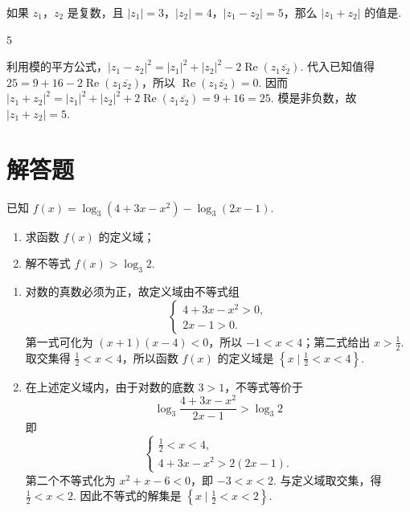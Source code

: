 \documentclass[UTF8,a4paper,oneside,11pt]{ctexbook}
\begin{document}
\begin{problem}
如果 \(z_1\)，\(z_2\) 是复数，且 \(\left| z_1 \right|=3\)，\(\left| z_2 \right|=4\)，\(\left| z_1-z_2 \right|=5\)，那么 \(\left| z_1+z_2 \right|\) 的值是\fillinblank{}.
\end{problem}

\begin{answer}
\(5\)
\end{answer}

\begin{solution}
利用模的平方公式，\(\left|z_1-z_2\right|^2=|z_1|^2+|z_2|^2-2\operatorname{Re}(z_1\overline{z_2})\). 代入已知值得 \(25=9+16-2\operatorname{Re}(z_1\overline{z_2})\)，所以 \(\operatorname{Re}(z_1\overline{z_2})=0\). 因而 \(\left|z_1+z_2\right|^2=|z_1|^2+|z_2|^2+2\operatorname{Re}(z_1\overline{z_2})=9+16=25\). 模是非负数，故 \(\left|z_1+z_2\right|=5\).
\end{solution}

\section{解答题}

\begin{problem}
已知 \(f(x)=\log_3\left( 4+3x-x^2 \right)-\log_3\left( 2x-1 \right)\).

\begin{enumerate}
\item 求函数 \(f(x)\) 的定义域；
\item 解不等式 \(f(x)>\log_3 2\).
\end{enumerate}
\end{problem}

\begin{solution}
\begin{enumerate}
\item 对数的真数必须为正，故定义域由不等式组
\[
\begin{cases}
4+3x-x^2>0,\\
2x-1>0.
\end{cases}
\]
第一式可化为 \((x+1)(x-4)<0\)，所以 \(-1<x<4\)；第二式给出 \(x>\frac12\). 取交集得 \(\frac12<x<4\)，所以函数 \(f(x)\) 的定义域是 \(\left\{x\mid\frac12<x<4\right\}\).

\item 在上述定义域内，由于对数的底数 \(3>1\)，不等式等价于
\[
\log_3\frac{4+3x-x^2}{2x-1}>\log_3 2
\]
即
\[
\begin{cases}
\frac{1}{2}<x<4,\\
4+3x-x^2>2(2x-1).
\end{cases}
\]
第二个不等式化为 \(x^2+x-6<0\)，即 \(-3<x<2\). 与定义域取交集，得 \(\frac12<x<2\). 因此不等式的解集是 \(\left\{x\mid\frac12<x<2\right\}\).
\end{enumerate}
\end{solution}
\end{document}
